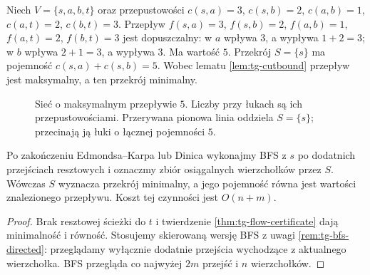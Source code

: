 \begin{przyklad}
\label{ex:tg-flow-cut-five}
Niech $V=\{s,a,b,t\}$
oraz przepustowości
$c(s,a)=3$, $c(s,b)=2$,
$c(a,b)=1$, $c(a,t)=2$,
$c(b,t)=3$.
Przepływ
$f(s,a)=3$, $f(s,b)=2$,
$f(a,b)=1$, $f(a,t)=2$,
$f(b,t)=3$
jest dopuszczalny:
w $a$ wpływa $3$,
a wypływa $1+2=3$;
w $b$ wpływa $2+1=3$,
a wypływa $3$.
Ma wartość $5$.
Przekrój $S=\{s\}$ ma pojemność
$c(s,a)+c(s,b)=5$.
Wobec lematu \ref{lem:tg-cutbound}
przepływ jest maksymalny,
a ten przekrój minimalny.
\end{przyklad}

\begin{figure}[htbp]
\centering
{}
\caption{Sieć o maksymalnym przepływie $5$.
Liczby przy łukach są ich przepustowościami.
Przerywana pionowa linia oddziela $S=\{s\}$;
przecinają ją łuki o łącznej pojemności $5$.}
\label{fig:tg-flow-cut-five}
\end{figure}

\begin{stwierdzenie}
\label{prop:tg-flow-recover-cut}
Po zakończeniu Edmondsa--Karpa lub Dinica
wykonajmy BFS z $s$ po dodatnich przejściach
resztowych i oznaczmy zbiór osiągalnych
wierzchołków przez $S$.
Wówczas $S$ wyznacza przekrój minimalny,
a jego pojemność równa jest
wartości znalezionego przepływu.
Koszt tej czynności jest $O(n+m)$.
\end{stwierdzenie}
\begin{proof}
Brak resztowej ścieżki do $t$
i twierdzenie \ref{thm:tg-flow-certificate}
dają minimalność i równość.
Stosujemy skierowaną wersję BFS z uwagi
\ref{rem:tg-bfs-directed}: przeglądamy wyłącznie
dodatnie przejścia wychodzące z aktualnego wierzchołka.
BFS przegląda co najwyżej
$2m$ przejść i $n$ wierzchołków.
\end{proof}

